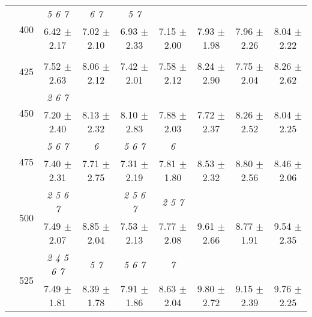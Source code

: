 \begin{table}[h]
{\begin{tabular}{
        ccccccccc}
 & \multirow{2}{*}{400}& \textit{ 5 6 7 }& \textit{ 6 7 }& \textit{ 5 7 }& & & &  \\ 
 & & 6.42 $\pm$ 2.17& 7.02 $\pm$ 2.10& 6.93 $\pm$ 2.33& 7.15 $\pm$ 2.00& 7.93 $\pm$ 1.98& 7.96 $\pm$ 2.26& 8.04 $\pm$ 2.22 \\ 
 & \multirow{2}{*}{425}& \cellcolor[HTML]{EFEFEF} & \cellcolor[HTML]{EFEFEF} & \cellcolor[HTML]{EFEFEF} & \cellcolor[HTML]{EFEFEF} & \cellcolor[HTML]{EFEFEF} & \cellcolor[HTML]{EFEFEF} & \cellcolor[HTML]{EFEFEF}  \\ 
 & & \cellcolor[HTML]{EFEFEF} 7.52 $\pm$ 2.63& \cellcolor[HTML]{EFEFEF} 8.06 $\pm$ 2.12& \cellcolor[HTML]{EFEFEF} 7.42 $\pm$ 2.01& \cellcolor[HTML]{EFEFEF} 7.58 $\pm$ 2.12& \cellcolor[HTML]{EFEFEF} 8.24 $\pm$ 2.90& \cellcolor[HTML]{EFEFEF} 7.75 $\pm$ 2.04& \cellcolor[HTML]{EFEFEF} 8.26 $\pm$ 2.62 \\ 
 & \multirow{2}{*}{450}& \textit{ 2 6 7 }& & & & & &  \\ 
 & & 7.20 $\pm$ 2.40& 8.13 $\pm$ 2.32& 8.10 $\pm$ 2.83& 7.88 $\pm$ 2.03& 7.72 $\pm$ 2.37& 8.26 $\pm$ 2.52& 8.04 $\pm$ 2.25 \\ 
 & \multirow{2}{*}{475}& \cellcolor[HTML]{EFEFEF} \textit{ 5 6 7 }& \cellcolor[HTML]{EFEFEF} \textit{ 6 }& \cellcolor[HTML]{EFEFEF} \textit{ 5 6 7 }& \cellcolor[HTML]{EFEFEF} \textit{ 6 }& \cellcolor[HTML]{EFEFEF} & \cellcolor[HTML]{EFEFEF} & \cellcolor[HTML]{EFEFEF}  \\ 
 & & \cellcolor[HTML]{EFEFEF} 7.40 $\pm$ 2.31& \cellcolor[HTML]{EFEFEF} 7.71 $\pm$ 2.75& \cellcolor[HTML]{EFEFEF} 7.31 $\pm$ 2.19& \cellcolor[HTML]{EFEFEF} 7.81 $\pm$ 1.80& \cellcolor[HTML]{EFEFEF} 8.53 $\pm$ 2.32& \cellcolor[HTML]{EFEFEF} 8.80 $\pm$ 2.56& \cellcolor[HTML]{EFEFEF} 8.46 $\pm$ 2.06 \\ 
 & \multirow{2}{*}{500}& \textit{ 2 5 6 7 }& & \textit{ 2 5 6 7 }& \textit{ 2 5 7 }& & &  \\ 
 & & 7.49 $\pm$ 2.07& 8.85 $\pm$ 2.04& 7.53 $\pm$ 2.13& 7.77 $\pm$ 2.08& 9.61 $\pm$ 2.66& 8.77 $\pm$ 1.91& 9.54 $\pm$ 2.35 \\ 
 & \multirow{2}{*}{525}& \cellcolor[HTML]{EFEFEF} \textit{ 2 4 5 6 7 }& \cellcolor[HTML]{EFEFEF} \textit{ 5 7 }& \cellcolor[HTML]{EFEFEF} \textit{ 5 6 7 }& \cellcolor[HTML]{EFEFEF} \textit{ 7 }& \cellcolor[HTML]{EFEFEF} & \cellcolor[HTML]{EFEFEF} & \cellcolor[HTML]{EFEFEF}  \\ 
 & & \cellcolor[HTML]{EFEFEF} 7.49 $\pm$ 1.81& \cellcolor[HTML]{EFEFEF} 8.39 $\pm$ 1.78& \cellcolor[HTML]{EFEFEF} 7.91 $\pm$ 1.86& \cellcolor[HTML]{EFEFEF} 8.63 $\pm$ 2.04& \cellcolor[HTML]{EFEFEF} 9.80 $\pm$ 2.72& \cellcolor[HTML]{EFEFEF} 9.15 $\pm$ 2.39& \cellcolor[HTML]{EFEFEF} 9.76 $\pm$ 2.25 \\ 

\end{tabular}}
\end{table}
